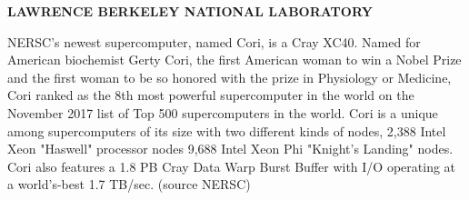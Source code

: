 


\begin{center}
  {\sc \bf LAWRENCE BERKELEY NATIONAL LABORATORY}\\
\end{center}
NERSC's newest supercomputer, named Cori, is a Cray XC40. Named for American biochemist Gerty Cori, the first American woman to win a Nobel Prize and the first woman to be so honored with the prize in Physiology or Medicine, Cori ranked as the 8th most powerful supercomputer in the world on the November 2017 list of Top 500 supercomputers in the world.   Cori is a unique among supercomputers of its size with two different kinds of nodes, 2,388 Intel Xeon "Haswell" processor nodes 9,688 Intel Xeon Phi "Knight's Landing" nodes. Cori also features a 1.8 PB Cray Data Warp Burst Buffer with I/O operating at a world's-best 1.7 TB/sec.
(source NERSC)
